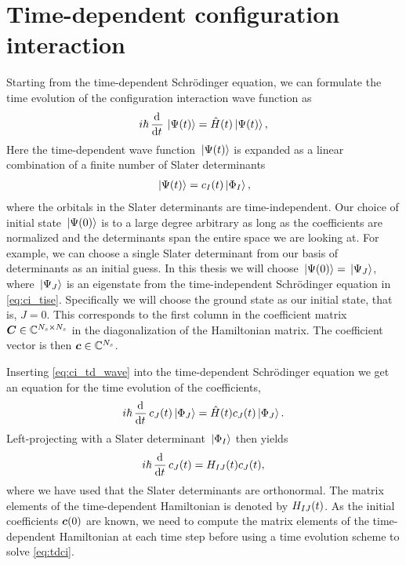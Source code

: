     \section{Time-dependent configuration interaction}
        Starting from the time-dependent Schrödinger equation, we can formulate
        the time evolution of the configuration interaction wave function as
        \begin{align}
            i\hslash \dod[]{}{t}\ket*{\Psi(t)}
            = \hamil(t)\ket*{\Psi(t)},
            \label{eq:ci_tdse}
        \end{align}
        Here the time-dependent wave function $\ket*{\Psi(t)}$ is expanded as a
        linear combination of a finite number of Slater determinants
        \begin{align}
            \ket*{\Psi(t)} = c_{I}(t) \ket*{\Phi_I},
            \label{eq:ci_td_wave}
        \end{align}
        where the orbitals in the Slater determinants are time-independent.
        Our choice of initial state $\ket*{\Psi(0)}$ is to a large degree
        arbitrary as long as the coefficients are normalized and the
        determinants span the entire space we are looking at.
        For example, we can choose a single Slater determinant from our basis of
        determinants as an initial guess.
        In this thesis we will choose $\ket*{\Psi(0)} = \ket*{\Psi_J}$, where
        $\ket*{\Psi_J}$ is an eigenstate from the time-independent Schrödinger
        equation in \autoref{eq:ci_tise}.
        Specifically we will choose the ground state as our initial state, that
        is, $J = 0$.
        This corresponds to the first column in the coefficient matrix
        $\boldsymbol{C} \in \mathbb{C}^{N_s \times N_s}$ in the diagonalization of the
        Hamiltonian matrix.
        The coefficient vector is then $\boldsymbol{c} \in \mathbb{C}^{N_s}$.

        Inserting \autoref{eq:ci_td_wave} into the time-dependent Schrödinger
        equation we get an equation for the time evolution of the coefficients,
        \begin{align}
            i\hslash \dod[]{}{t}c_{J}(t)\ket*{\slat_J}
            = \hamil(t) c_{J}(t)\ket*{\slat_J}.
        \end{align}
        Left-projecting with a Slater determinant $\ket*{\Phi_I}$ then yields
        \begin{gather}
            i\hslash \dod[]{}{t}c_{J}(t)
            = \hamilten_{IJ}(t) c_{J}(t),
            \label{eq:tdci}
        \end{gather}
        where we have used that the Slater determinants are orthonormal.
        The matrix elements of the time-dependent Hamiltonian is denoted by
        $H_{IJ}(t)$.
        As the initial coefficients $\boldsymbol{c}(0)$ are known, we need to compute
        the matrix elements of the time-dependent Hamiltonian at each time step
        before using a time evolution scheme to solve \autoref{eq:tdci}.

\clearemptydoublepage
